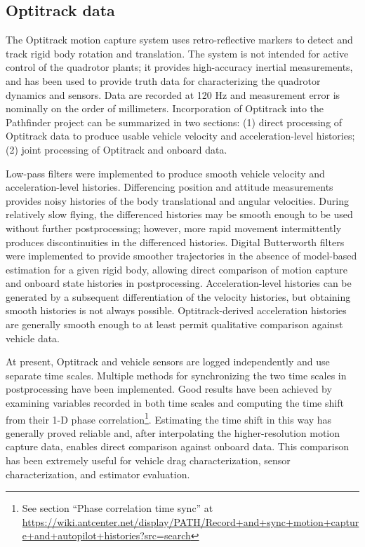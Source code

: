 \documentclass{article}
\begin{document}
\subsection{Optitrack data}

The Optitrack motion capture system uses retro-reflective markers to detect and track rigid body rotation and translation. The system is not intended for active control of the quadrotor plants; it provides high-accuracy inertial measurements, and has been used to provide truth data for characterizing the quadrotor dynamics and sensors. Data are recorded at 120 Hz and measurement error is nominally on the order of millimeters. Incorporation of Optitrack into the Pathfinder project can be summarized in two sections: (1) direct processing of Optitrack data to produce usable vehicle velocity and acceleration-level histories; (2) joint processing of Optitrack and onboard data.

Low-pass filters were implemented to produce smooth vehicle velocity and acceleration-level histories. Differencing position and attitude measurements provides noisy histories of the body translational and angular velocities. During relatively slow flying, the differenced histories may be smooth enough to be used without further postprocessing; however, more rapid movement intermittently produces discontinuities in the differenced histories. Digital Butterworth filters were implemented to provide smoother trajectories in the absence of model-based estimation for a given rigid body, allowing direct comparison of motion capture and onboard state histories in postprocessing. Acceleration-level histories can be generated by a subsequent differentiation of the velocity histories, but obtaining smooth histories is not always possible. Optitrack-derived acceleration histories are generally smooth enough to at least permit qualitative comparison against vehicle data.

At present, Optitrack and vehicle sensors are logged independently and use separate time scales. Multiple methods for synchronizing the two time scales in postprocessing have been implemented. Good results have been achieved by examining variables recorded in both time scales and computing the time shift from their 1-D phase correlation\footnote{See section ``Phase correlation time sync'' at  \url{https://wiki.antcenter.net/display/PATH/Record+and+sync+motion+capture+and+autopilot+histories?src=search}}. Estimating the time shift in this way has generally proved reliable and, after interpolating the higher-resolution motion capture data, enables direct comparison against onboard data. This comparison has been extremely useful for vehicle drag characterization, sensor characterization, and estimator evaluation.
\end{document}
